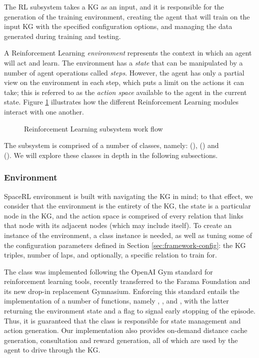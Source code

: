 The RL subsystem takes a KG as an input, and it is responsible for the generation of the training environment, creating the agent that will train on the input KG with the specified configuration options, and managing the data generated during training and testing. 

A Reinforcement Learning \emph{environment} represents the context in which an agent will act and learn. The environment has a \emph{state} that can be manipulated by a number of agent operations called \emph{steps}. However, the agent has only a partial view on the environment in each step,  which puts a limit on the actions it can take; this is referred to as the \emph{action space} available to the agent in the current state. Figure \ref{fig:rl_flow} illustrates how the different Reinforcement Learning modules interact with one another.

\begin{figure}[!h]
    \centering
    
    \caption{Reinforcement Learning subsystem work flow}
    \label{fig:rl_flow}
\end{figure}

The subsystem is comprised of a number of classes, namely:   (),  () and  \\(). We will explore these classes in depth in the following subsections.

\subsubsection{Environment}

SpaceRL environment is built with navigating the KG in mind; to that effect, we consider that the environment is the entirety of the KG, the state is a particular node in the KG, and the action space is comprised of every relation that links that node with its adjacent nodes (which may include itself).
To create an instance of the environment, a  class instance is needed, as well as tuning some of the configuration parameters defined in Section \ref{sec:framework-config}: the KG triples, number of laps, and optionally, a specific relation to train for.

The  class was implemented following the OpenAI Gym \cite{OpenAIGym} standard for reinforcement learning tools, recently transferred to the Farama Foundation and its new drop-in replacement Gymnasium\cite{Gymnasium}.
Enforcing this standard entails the implementation of a number of functions, namely , ,  and , with the latter returning the environment state and a  flag to signal early stopping of the episode. Thus, it is guaranteed that the  class is responsible for state management and action generation. Our implementation also provides on-demand distance cache generation, consultation and reward generation, all of which are used by the agent to drive through the KG.

